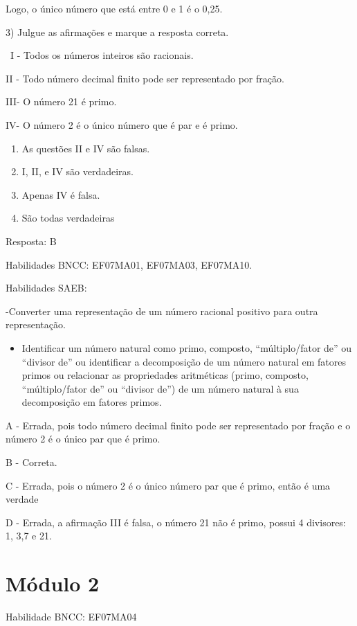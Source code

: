 Logo, o único número que está entre 0 e 1 é o 0,25.

3) Julgue as afirmações e marque a resposta correta.

~I - Todos os números inteiros são racionais.

II - Todo número decimal finito pode ser representado por fração.

III- O número 21 é primo.

IV- O número 2 é o único número que é par e é primo.

\begin{enumerate}
\def\labelenumi{\alph{enumi})}
\item
  As questões II e IV são falsas.
\item
  I, II, e IV são verdadeiras.
\item
  Apenas IV é falsa.
\item
  São todas verdadeiras
\end{enumerate}

Resposta: B

Habilidades BNCC: EF07MA01, EF07MA03, EF07MA10.

Habilidades SAEB:

-Converter uma representação de um número racional positivo para outra
representação.

\begin{itemize}
\tightlist
\item
  Identificar um número natural como primo, composto, ``múltiplo/fator
  de'' ou ``divisor de'' ou identificar a decomposição de um número
  natural em fatores primos ou relacionar as propriedades aritméticas
  (primo, composto, ``múltiplo/fator de'' ou ``divisor de'') de um
  número natural à sua decomposição em fatores primos.
\end{itemize}

A - Errada, pois todo número decimal finito pode ser representado por
fração e o número 2 é o único par que é primo.

B - Correta.

C - Errada, pois o número 2 é o único número par que é primo, então é
uma verdade

D - Errada, a afirmação III é falsa, o número 21 não é primo, possui 4
divisores: 1, 3,7 e 21.

\section{Módulo 2}

Habilidade BNCC: EF07MA04

